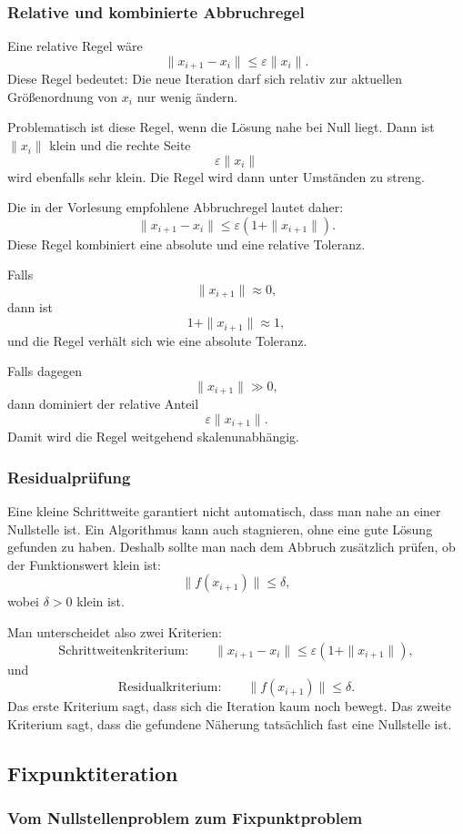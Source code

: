 \documentclass[10pt, letterpaper]{article}
\begin{document}
\subsubsection{Relative und kombinierte Abbruchregel}

Eine relative Regel wäre
\[
\|x_{i+1}-x_i\|\leq \varepsilon \|x_i\|.
\]
Diese Regel bedeutet: Die neue Iteration darf sich relativ zur aktuellen Größenordnung von \(x_i\) nur wenig ändern.

Problematisch ist diese Regel, wenn die Lösung nahe bei Null liegt. Dann ist \(\|x_i\|\) klein und die rechte Seite
\[
\varepsilon\|x_i\|
\]
wird ebenfalls sehr klein. Die Regel wird dann unter Umständen zu streng.

Die in der Vorlesung empfohlene Abbruchregel lautet daher:
\[
\boxed{
\|x_{i+1}-x_i\|
\leq
\varepsilon(1+\|x_{i+1}\|).
}
\]
Diese Regel kombiniert eine absolute und eine relative Toleranz.

Falls
\[
\|x_{i+1}\|\approx 0,
\]
dann ist
\[
1+\|x_{i+1}\|\approx 1,
\]
und die Regel verhält sich wie eine absolute Toleranz.

Falls dagegen
\[
\|x_{i+1}\|\gg 0,
\]
dann dominiert der relative Anteil
\[
\varepsilon\|x_{i+1}\|.
\]
Damit wird die Regel weitgehend skalenunabhängig.

\subsubsection{Residualprüfung}

Eine kleine Schrittweite garantiert nicht automatisch, dass man nahe an einer Nullstelle ist. Ein Algorithmus kann auch stagnieren, ohne eine gute Lösung gefunden zu haben. Deshalb sollte man nach dem Abbruch zusätzlich prüfen, ob der Funktionswert klein ist:
\[
\boxed{
\|f(x_{i+1})\|\leq \delta,
}
\]
wobei \(\delta>0\) klein ist.

Man unterscheidet also zwei Kriterien:
\[
\text{Schrittweitenkriterium:}
\qquad
\|x_{i+1}-x_i\|
\leq
\varepsilon(1+\|x_{i+1}\|),
\]
und
\[
\text{Residualkriterium:}
\qquad
\|f(x_{i+1})\|\leq \delta.
\]
Das erste Kriterium sagt, dass sich die Iteration kaum noch bewegt. Das zweite Kriterium sagt, dass die gefundene Näherung tatsächlich fast eine Nullstelle ist.

\subsection{Fixpunktiteration}

\subsubsection{Vom Nullstellenproblem zum Fixpunktproblem}
\end{document}
